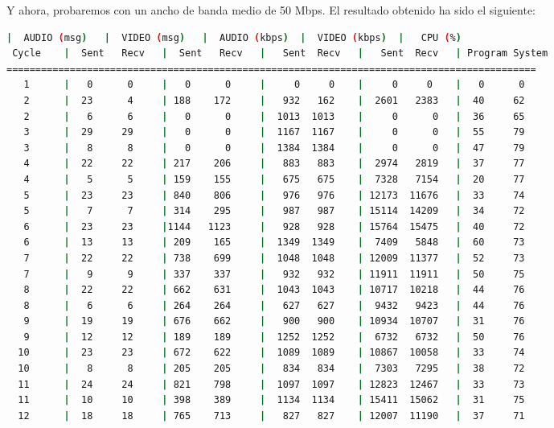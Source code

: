 \newpage

Y ahora, probaremos con un ancho de banda medio de 50 Mbps. El resultado obtenido ha sido el siguiente:

\begin{adjustbox}{max width=\textwidth}
\begin{lstlisting}[language=bash,basicstyle=\ttfamily\scriptsize]
          |  AUDIO (msg)   |  VIDEO (msg)   |  AUDIO (kbps)  |  VIDEO (kbps)  |   CPU (%)
 Cycle    |  Sent   Recv   |  Sent   Recv   |   Sent  Recv   |   Sent  Recv   | Program System
============================================================================================
   1      |   0      0     |   0      0     |     0     0    |     0     0    |   0      0
   2      |  23      4     | 188    172     |   932   162    |  2601   2383   |  40     62
   2      |   6      6     |   0      0     |  1013  1013    |     0      0   |  36     65
   3      |  29     29     |   0      0     |  1167  1167    |     0      0   |  55     79
   3      |   8      8     |   0      0     |  1384  1384    |     0      0   |  47     79
   4      |  22     22     | 217    206     |   883   883    |  2974   2819   |  37     77
   4      |   5      5     | 159    155     |   675   675    |  7328   7154   |  20     77
   5      |  23     23     | 840    806     |   976   976    | 12173  11676   |  33     74
   5      |   7      7     | 314    295     |   987   987    | 15114  14209   |  34     72
   6      |  23     23     |1144   1123     |   928   928    | 15764  15475   |  40     72
   6      |  13     13     | 209    165     |  1349  1349    |  7409   5848   |  60     73
   7      |  22     22     | 738    699     |  1048  1048    | 12009  11377   |  52     73
   7      |   9      9     | 337    337     |   932   932    | 11911  11911   |  50     75
   8      |  22     22     | 662    631     |  1043  1043    | 10717  10218   |  44     76
   8      |   6      6     | 264    264     |   627   627    |  9432   9423   |  44     76
   9      |  19     19     | 676    662     |   900   900    | 10934  10707   |  31     76
   9      |  12     12     | 189    189     |  1252  1252    |  6732   6732   |  50     76
  10      |  23     23     | 672    622     |  1089  1089    | 10867  10058   |  33     74
  10      |   8      8     | 205    205     |   834   834    |  7303   7295   |  38     72
  11      |  24     24     | 821    798     |  1097  1097    | 12823  12467   |  33     73
  11      |  10     10     | 398    389     |  1134  1134    | 15411  15062   |  31     75
  12      |  18     18     | 765    713     |   827   827    | 12007  11190   |  37     71

\end{lstlisting}
\end{adjustbox}
